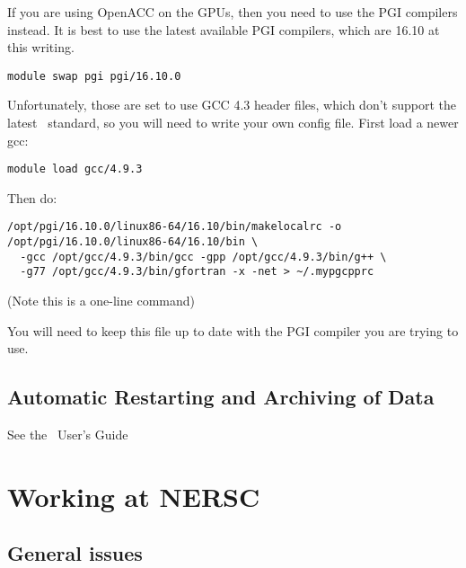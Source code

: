 If you are using OpenACC on the GPUs, then you need to use the PGI
compilers instead.  It is best to use the latest available PGI
compilers, which are 16.10 at this writing.  
\begin{verbatim}
module swap pgi pgi/16.10.0
\end{verbatim}

Unfortunately, those are set to use GCC 4.3 header files, which don't
support the latest \cpp\ standard, so you will need to write your
own config file.  First load a newer gcc:
\begin{verbatim}
module load gcc/4.9.3
\end{verbatim}

Then do:
\begin{verbatim}
/opt/pgi/16.10.0/linux86-64/16.10/bin/makelocalrc -o /opt/pgi/16.10.0/linux86-64/16.10/bin \
  -gcc /opt/gcc/4.9.3/bin/gcc -gpp /opt/gcc/4.9.3/bin/g++ \
  -g77 /opt/gcc/4.9.3/bin/gfortran -x -net > ~/.mypgcpprc
\end{verbatim}
(Note this is a one-line command)

You will need to keep this file up to date with the PGI compiler you are trying to use.


\subsection{Automatic Restarting and Archiving of Data}

See the \maestro\ User's Guide


\section{Working at NERSC}

\subsection{General issues}




